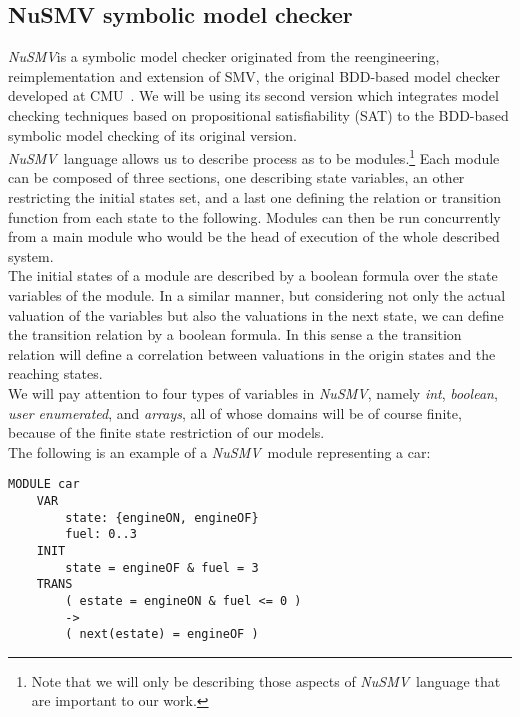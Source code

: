 \documentclass[12pt]{article}
\newcommand{\nusmv}{\mbox{\textit{NuSMV}}}
\begin{document}
\subsection{NuSMV symbolic model checker}\label{nusmv}
\nusmv is a symbolic model checker originated from the reengineering,
reimplementation and extension of SMV, the original BDD-based model checker
developed at CMU~\cite{cimatti}. We will be using its second version which
integrates model checking techniques based on propositional satisfiability
(SAT) to the BDD-based symbolic model checking of its original version.\\
\nusmv ~language allows us to describe process as to be modules.\footnote{Note
that we will only be describing those aspects of \nusmv ~language that are
important to our work.} Each module
can be composed of three sections, one describing state variables, an other
restricting the initial states set, and a last one defining the relation or
transition function from each state to the following. Modules can then be run
concurrently from a main module who would be the head of execution of the whole
described system.\\
The initial states of a module are described by a boolean formula over the
state variables of the module. In a similar manner, but considering not
only the actual valuation of the variables but also the valuations in
the next state, we can define the transition relation by a boolean formula.
In this sense a the transition relation will define a correlation between
valuations in the origin states and the reaching states.\\
We will pay attention to four types of variables in \nusmv, namely \textit{int}, \textit{boolean}, \textit{user enumerated}, and \textit{arrays}, all of whose domains will be of course
finite, because of the finite state restriction of our models.\\
The following is an example of a \nusmv ~module representing a car:

\begin{verbatim}
MODULE car
    VAR
        state: {engineON, engineOF}
        fuel: 0..3
    INIT
        state = engineOF & fuel = 3
    TRANS
        ( estate = engineON & fuel <= 0 ) 
        -> 
        ( next(estate) = engineOF )
\end{verbatim}
\end{document}
